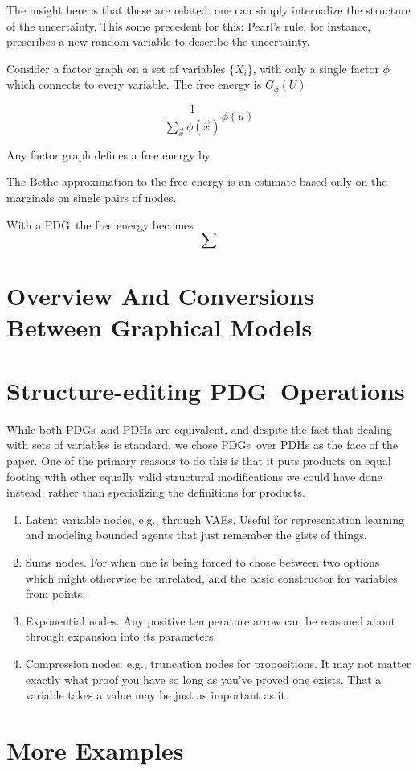 \documentclass{article}
\newcommand{\MN}{PDG}
\newcommand{\MNH}{PDH}
\newcommand{\MNs}{\MN s}
\begin{document}
	The insight here is that these are related: one can simply internalize the structure of the uncertainty. This some precedent for this: Pearl's rule, for instance, prescribes a new random variable to describe the uncertainty.	
	
	Consider a factor graph on a set of variables $\{ X_i \}$, with only a single factor $\phi$ which connects to every variable. The free energy is $G_\phi(U)$
	
	\[ \frac{1}{\sum_{\vec x} \phi(\vec x)} \phi(u) \]
	
	
	Any factor graph defines a free energy by 
	
	The Bethe approximation to the free energy is an estimate based only on the marginals on single pairs of nodes.
		
	With a \MN\, the free energy becomes
	\[ \sum \]
	
	\section{Overview And Conversions Between Graphical Models}
	\label{sec:many-relations-graphical-models}
	
	
	
	\section{Structure-editing \MN\ Operations}
	
	While both \MNs\ and \MNH s are equivalent, and despite the fact that dealing with sets of variables is standard, we chose \MNs\ over \MNH s as the face of the paper. One of the primary reasons to do this is that it puts products on equal footing with other equally valid structural modifications we could have done instead, rather than specializing the definitions for products.
	
	\begin{enumerate}
		\item Latent variable nodes, e.g., through VAEs. Useful for representation learning and modeling bounded agents that just remember the gists of things.
		
		\item Sums nodes. For when one is being forced to chose between two options which might otherwise be unrelated, and the basic constructor for variables from points.
		
		\item Exponential nodes. Any positive temperature arrow can be reasoned about through expansion into its parameters.
		
		\item Compression nodes: e.g., truncation nodes for propositions. It may not matter exactly what proof you have so long as you've proved one exists. That a variable takes a value may be just as important as it.
	\end{enumerate}
	
	
	\section{More Examples}\label{sec:more-examples}
	
	\begin{example}
		\label{ex:corrob}
	\end{example}
	
		
	
\end{document}
